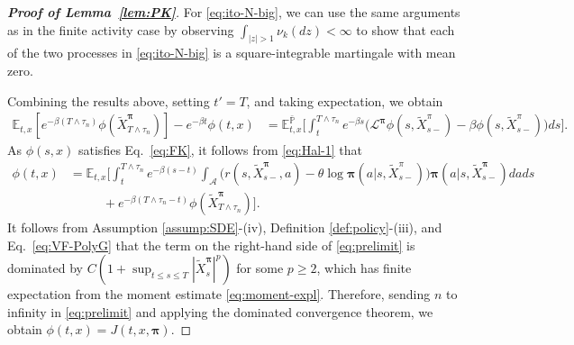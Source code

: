 \documentclass[11pt]{article}
\newcommand{\1}{\mathbbm{1}}
\newcommand{\bpi}{\boldsymbol{\pi}}
\begin{document}
\begin{proof}[\bf Proof of Lemma~\ref{lem:PK}]
	For \eqref{eq:ito-N-big}, we can use the same arguments as in the finite activity case by observing $\int_{|z|>1} \nu_k(dz)<\infty$
	to show that each of the two processes in \eqref{eq:ito-N-big} is a square-integrable martingale with mean zero.
		
	Combining the results above, setting $t'=T$, and taking expectation, we obtain
	\begin{align*}
	\mathbb{E}_{t,x}[e^{-\beta(T\wedge\tau_n)}\phi( \tilde X^{\bpi}_{T\wedge\tau_n})] - e^{-\beta t}\phi(t, x)
	&= \mathbb{E}^{\bar{\mathbb{P}}}_{t,x} \bigg[ \int_t^{T\wedge\tau_n} e^{-\beta s}\big(\mathcal{L}^{\bpi} \phi(s, \tilde X^{\pi}_{s-})-\beta\phi(s, \tilde X^{\pi}_{s-})\big)ds\bigg].
	\end{align*}
	As $\phi(s,x)$ satisfies Eq.~\eqref{eq:FK}, it follows from \eqref{eq:Hal-1} that
\begin{align}
	\phi(t,x)
	&= \mathbb{E}_{t,x} \bigg[ \int_t^{T\wedge \tau_n} e^{-\beta (s-t)}\int_{\mathcal{A}}  \big(r(s, \tilde X^{\bpi}_{s-}, a) - \theta\log{\bpi}(a|s, \tilde X^{\pi}_{s-})\big)\bpi(a|s,\tilde X^{\bpi}_{s-})dads \\
	&\phantom{\mathbb{E}_{t,x} \bigg[\bigg]~~} + e^{-\beta (T\wedge\tau_n-t)}\phi( \tilde X^{\bpi}_{T\wedge\tau_n})\bigg]. \label{eq:prelimit}
\end{align}
It follows from Assumption \ref{assump:SDE}-(iv), Definition \ref{def:policy}-(iii), and Eq.~\eqref{eq:VF-PolyG} that the term on the right-hand side of \eqref{eq:prelimit} is dominated by $C(1 + \sup_{t \le s \le T} |\tilde X_{s}^{\bpi}|^p)$ for some $p\geq 2$, which has finite expectation from the moment estimate \eqref{eq:moment-expl}.
Therefore, sending $n$ to infinity in \eqref{eq:prelimit} and applying the dominated convergence theorem, we obtain $\phi(t,x)=J(t, x, \bpi)$.\end{proof}
\end{document}
